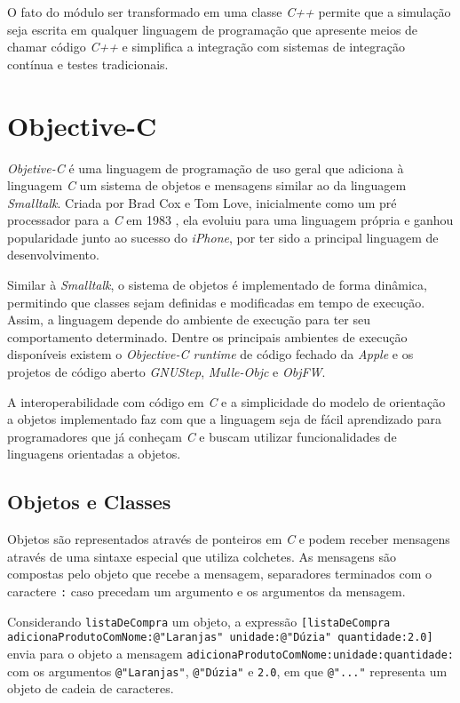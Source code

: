 O fato do módulo ser transformado em uma classe \emph{C++} permite que a simulação seja escrita
em qualquer linguagem de programação que apresente meios de chamar código \emph{C++}
e simplifica a integração com sistemas de integração 
contínua e testes tradicionais.

\newpage
\section{Objective-C}
\label{sec:ObjC}

\emph{Objetive-C} é uma linguagem de programação de uso geral que adiciona
à linguagem \emph{C} um sistema de objetos e mensagens similar ao da 
linguagem \emph{Smalltalk}. Criada por Brad Cox e Tom Love, inicialmente como um pré processador
para a \emph{C} em 1983 \citep{OOPC}, ela evoluiu para uma linguagem própria
e ganhou popularidade junto ao sucesso do \emph{iPhone}, por ter sido a 
principal linguagem de desenvolvimento.

Similar à \emph{Smalltalk}, o sistema de objetos é implementado de forma dinâmica,
permitindo que classes sejam definidas e modificadas em tempo de execução.
Assim, a linguagem depende do ambiente de execução para ter seu comportamento
determinado. Dentre os principais ambientes de execução disponíveis existem o
\emph{Objective-C runtime} de código fechado da \emph{Apple} e os projetos
de código aberto \emph{GNUStep}, \emph{Mulle-Objc} e \emph{ObjFW}.

A interoperabilidade com código em \emph{C} e a simplicidade do modelo
de orientação a objetos implementado faz com que a linguagem seja
de fácil aprendizado para programadores que já conheçam \emph{C} e buscam
utilizar funcionalidades de linguagens orientadas a objetos. 

\subsection{Objetos e Classes}
\label{sec:class}

Objetos são representados através de ponteiros em \emph{C} e podem
receber mensagens através de uma sintaxe especial que utiliza colchetes.
As mensagens são compostas pelo objeto que recebe a mensagem, separadores 
terminados com o caractere \texttt{:} caso precedam um argumento e os
argumentos da mensagem.

Considerando \texttt{listaDeCompra} um objeto, a expressão
\texttt{[listaDeCompra adicionaProdutoComNome:@"Laranjas" unidade:@"Dúzia" quantidade:2.0]}
envia para o objeto a mensagem \texttt{adicionaProdutoComNome:unidade:quantidade:} com os argumentos
\texttt{@"Laranjas"}, \texttt{@"Dúzia"} e \texttt{2.0}, em que \texttt{@"..."} representa um objeto de
cadeia de caracteres.

